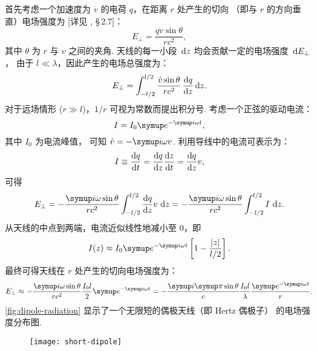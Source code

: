 首先考虑一个加速度为 $\dot{v}$ 的电荷 $q$，在距离 $r$ 处产生的切向
（即与 $r$ 的方向垂直）电场强度为 [详见 , \S\,2.7]：
\begin{equation}
  \label{eq:q-efield}
  E_{\bot} = \frac{q \dot{v} \sin\theta}{r c^2} ,
\end{equation}
其中 $\theta$ 为 $r$ 与 $v$ 之间的夹角.
天线的每一小段 $\,\mathrm{d}z$ 均会贡献一定的电场强度 $\,\mathrm{d}E_{\bot}$，
由于 $l \ll \lambda$，因此产生的电场总强度为：
\begin{equation}
  \label{eq:dipole-efield1}
  E_{\bot} = \int_{-l/2}^{l/2}
    \frac{\dot{v} \sin\theta}{r c^2} \,\frac{\mathrm{d}q}{\mathrm{d}z}\,\mathrm{d}z .
\end{equation}
对于远场情形 ($r \gg l$)，$1/r$ 可视为常数而提出积分号.
考虑一个正弦的驱动电流：
\begin{equation}
  \label{eq:dipole-current}
  I = I_0 \Ce^{-\Ci \omega t} ,
\end{equation}
其中 $I_0$ 为电流峰值，
可知 $\dot{v} = -\Ci \omega v$.
利用导线中的电流可表示为：
\begin{equation}
  \label{eq:wire-current}
  I \equiv \frac{\mathrm{d}q}{\mathrm{d}t} = \frac{\mathrm{d}q}{\mathrm{d}z} \frac{\mathrm{d}z}{\mathrm{d}t} = \frac{\mathrm{d}q}{\mathrm{d}z} v ,
\end{equation}
可得
\begin{equation}
  \label{eq:dipole-efield2}
  E_{\bot}
    = -\frac{\Ci\omega \sin\theta}{r c^2}
      \int_{-l/2}^{l/2} \diff{q}{z} v \,\D{z}
    = -\frac{\Ci\omega \sin\theta}{r c^2} \int_{-l/2}^{l/2} I\,\D{z} .
\end{equation}
从天线的中点到两端，电流近似线性地减小至 0，即
\begin{equation}
  \label{eq:dipole-current-dist}
  I(z) \approx I_0 \Ce^{-\Ci\omega t}
    \left[ 1 - \frac{|z|}{l/2} \right] .
\end{equation}
最终可得天线在 $r$ 处产生的切向电场强度为：
\begin{equation}
  \label{eq:dipole-efield}
  E_{\bot} \approx
    -\frac{\Ci\omega \sin\theta}{r c^2} \frac{I_0 l}{2} \Ce^{-\Ci\omega t}
    = -\frac{\Ci\Cpi \sin\theta}{c} \frac{I_0 l}{\lambda}
      \frac{\Ce^{-\Ci\omega t}}{r} .
\end{equation}
\autoref{fig:dipole-radiation} 显示了一个无限短的偶极天线（即 Hertz 偶极子）
的电场强度分布图.

\begin{figure}
  \centering
  \texttt{[image: short-dipole]}
  \label{fig:short-dipole}
\end{figure}

